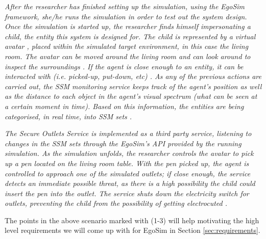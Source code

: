 \begin{flushright}{\slshape
After the researcher has finished setting up the simulation, using the EgoSim framework, she/he runs the simulation in order to test out the system design. Once the simulation is started up, the researcher finds himself impersonating a child, the entity this system is designed for. The child is represented by a virtual avatar , placed within the simulated target environment, in this case the living room. The avatar can be moved around the living room  and can look around to inspect the surroundings . If the agent is close enough to an entity, it can be interacted with (i.e. picked-up, put-down, etc) . As any of the previous actions are carried out, the SSM monitoring service  keeps track of the agent's position as well as the distance to each object in the agent's visual spectrum (what can be seen at a certain moment in time). Based on this information, the entities are being categorised, in real time, into SSM sets .
} \\ \medskip
\end{flushright}

\begin{flushright}{\slshape
The Secure Outlets Service is implemented as a third party service, listening to changes in the SSM sets through the EgoSim's API provided by the running simulation. As the simulation unfolds, the researcher controls the avatar to pick up a pen located on the living room table. With the pen picked up, the agent is controlled to approach one of the simulated outlets; if close enough, the service detects an immediate possible threat, as there is a high possibility the child could insert the pen into the outlet. The service shuts down the electricity switch for outlets, preventing the child from the possibility of getting electrocuted .
} \\ \medskip
\end{flushright}

The points in the above scenario marked with (1-3) will help motivating the high level requirements we will come up with for EgoSim in Section \ref{sec:requirements}.
